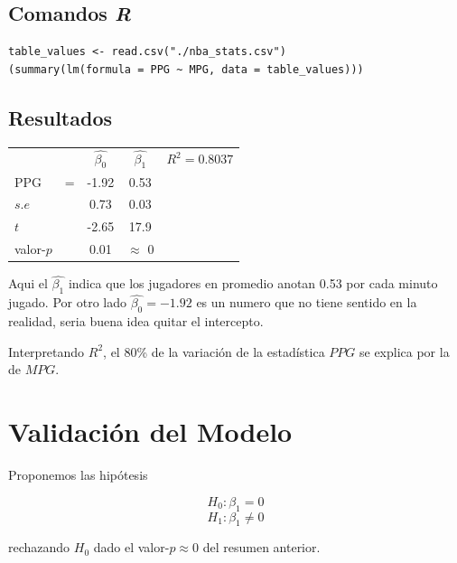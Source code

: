 \documentclass[onecolumn]{IEEEtran}
\begin{document}
    \subsection*{Comandos \textit{R}}
    \begin{verbatim}
table_values <- read.csv("./nba_stats.csv")
(summary(lm(formula = PPG ~ MPG, data = table_values)))
    \end{verbatim}
    \newpage
    \subsection*{Resultados}
    \begin{table}[h]
        \centering
        \begin{tabular}{l l c c r}
            & & $\hat{\beta_0}$ & $\hat{\beta_1}$ & \quad $R^2 = 0.8037$ \\
            PPG & = & -1.92 & 0.53 &\\
            $s.e$ &  & 0.73 & 0.03 &\\
            $t$ & & -2.65 & 17.9 &\\
            valor-$p$ & & 0.01 & $\approx$ 0 &
        \end{tabular}
    \end{table}
    
    Aqui el $\hat{\beta_1}$ indica que los jugadores en promedio anotan 0.53 por cada minuto jugado. Por otro lado $\hat{\beta_0} = -1.92$ es un numero que no tiene sentido en la realidad, seria buena idea quitar el intercepto.

    Interpretando $R^2$, el 80\% de la variaci\'on de la estad\'istica $PPG$ se explica por la de $MPG$.
    \section{Validaci\'on del Modelo}
    Proponemos las hip\'otesis
    
    $$
        H_0 : \beta_1 = 0
    $$
    $$
        H_1 : \beta_1 \neq 0
    $$

    rechazando $H_0$ dado el valor-$p \approx 0$ del resumen anterior.
\end{document}
